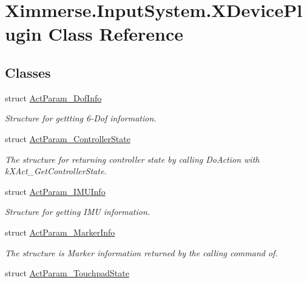 \hypertarget{class_ximmerse_1_1_input_system_1_1_x_device_plugin}{}\section{Ximmerse.\+Input\+System.\+X\+Device\+Plugin Class Reference}
\label{class_ximmerse_1_1_input_system_1_1_x_device_plugin}
\subsection*{Classes}
\begin{DoxyCompactItemize}
\item 
struct \mbox{\hyperlink{struct_ximmerse_1_1_input_system_1_1_x_device_plugin_1_1_act_param__6_dof_info}{Act\+Param\+\_\+Dof\+Info}}
\begin{DoxyCompactList}\small\item\em Structure for gettting 6-\/\+Dof information. \end{DoxyCompactList}\item 
struct \mbox{\hyperlink{struct_ximmerse_1_1_input_system_1_1_x_device_plugin_1_1_act_param___controller_state}{Act\+Param\+\_\+\+Controller\+State}}
\begin{DoxyCompactList}\small\item\em The structure for returning controller state by calling Do\+Action with k\+X\+Act\+\_\+\+Get\+Controller\+State. \end{DoxyCompactList}\item 
struct \mbox{\hyperlink{struct_ximmerse_1_1_input_system_1_1_x_device_plugin_1_1_act_param___i_m_u_info}{Act\+Param\+\_\+\+I\+M\+U\+Info}}
\begin{DoxyCompactList}\small\item\em Structure for getting I\+MU information. ~\newline
 \end{DoxyCompactList}\item 
struct \mbox{\hyperlink{struct_ximmerse_1_1_input_system_1_1_x_device_plugin_1_1_act_param___marker_info}{Act\+Param\+\_\+\+Marker\+Info}}
\begin{DoxyCompactList}\small\item\em The structure is Marker information returned by the calling command of. \end{DoxyCompactList}\item 
struct \mbox{\hyperlink{struct_ximmerse_1_1_input_system_1_1_x_device_plugin_1_1_act_param___touchpad_state}{Act\+Param\+\_\+\+Touchpad\+State}}

\end{DoxyCompactItemize}
